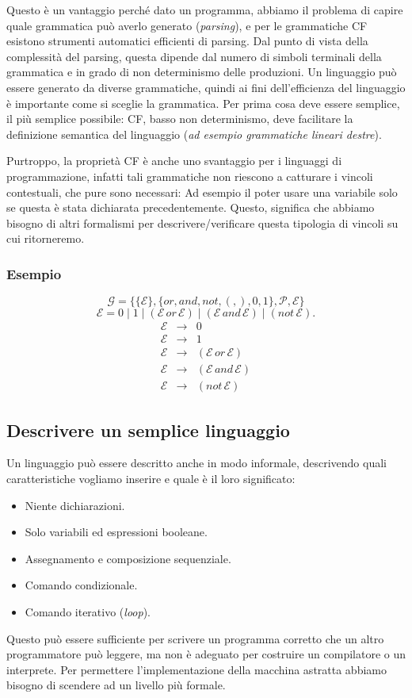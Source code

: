 \documentclass[oneside,a4paper,11pt]{book}
\theoremstyle{italicstyle}
\theoremstyle{normStyle}
\begin{document}
Questo è un vantaggio perché dato un programma, abbiamo il problema di capire 
quale grammatica può averlo generato (\textit{parsing}), e per le grammatiche 
CF esistono strumenti automatici efficienti di parsing. Dal punto di vista 
della complessità del parsing, questa dipende dal numero di simboli terminali della 
grammatica e in grado di non determinismo delle produzioni. Un linguaggio 
può essere generato da diverse grammatiche, quindi ai fini dell'efficienza 
del linguaggio è importante come si sceglie la grammatica. Per prima cosa 
deve essere semplice, il più semplice possibile: CF, basso non determinismo, 
deve facilitare la definizione semantica del linguaggio (\textit{ad esempio 
grammatiche lineari destre}).

Purtroppo, la proprietà CF è anche uno svantaggio per i linguaggi di programmazione,
infatti tali grammatiche non riescono a catturare i vincoli contestuali, che 
pure sono necessari: Ad esempio il poter usare una variabile solo se 
questa è stata dichiarata precedentemente. Questo, significa che abbiamo bisogno 
di altri formalismi per descrivere/verificare questa tipologia di vincoli 
su cui ritorneremo.
\subsubsection{Esempio}
\[
\mathcal{G}=\{\{\mathcal{E}\},\{or,and,not,(,),0,1\}, \mathcal{P}, \mathcal{E}\}
\]
\[
\mathcal{E}=0\mid 1 \mid (\mathcal{E}\,or\,\mathcal{E})\mid (\mathcal{E} \,and\,\mathcal{E})\mid 
(not\, \mathcal{E}).
\]
\[
\begin{matrix}
  \mathcal{E} & \longrightarrow & 0 \\
  \mathcal{E} & \longrightarrow & 1 \\
  \mathcal{E} & \longrightarrow & (\mathcal{E}\,or\,\mathcal{E}) \\
  \mathcal{E} & \longrightarrow & (\mathcal{E}\,and\,\mathcal{E}) \\
  \mathcal{E} & \longrightarrow & (not\,\mathcal{E})
\end{matrix}
\]
\subsection{Descrivere un semplice linguaggio}
Un linguaggio può essere descritto anche in modo informale, descrivendo 
quali caratteristiche vogliamo inserire e quale è il loro significato:
\begin{itemize}
  \item Niente dichiarazioni.
  \item Solo variabili ed espressioni booleane.
  \item Assegnamento e composizione sequenziale.
  \item Comando condizionale.
  \item Comando iterativo (\textit{loop}).
\end{itemize}
Questo può essere sufficiente per scrivere un programma corretto che un altro 
programmatore può leggere, ma non è adeguato per costruire un compilatore o 
un interprete. Per permettere l'implementazione della macchina astratta abbiamo 
bisogno di scendere ad un livello più formale.
\end{document}
